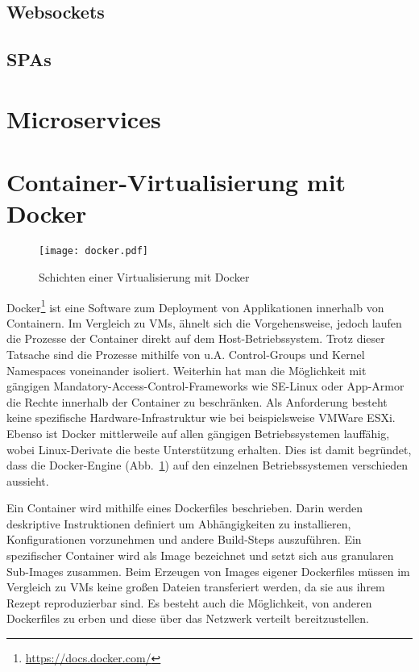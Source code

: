 \subsection{Websockets}
\blindtext
\subsection{\aclp{SPA}}
\blindtext
\section{Microservices}
\blindtext
\section{Container-Virtualisierung mit Docker}
\begin{figure}
  \centering
  \texttt{[image: docker.pdf]}
  \par
  \caption{Schichten einer Virtualisierung mit Docker}
  \label{fig:layers-docker}
\end{figure}
Docker\footnote{\url{https://docs.docker.com/}} ist eine Software zum Deployment von Applikationen innerhalb von Containern.
Im Vergleich zu \acp{VM}, ähnelt sich die Vorgehensweise, jedoch laufen die Prozesse der Container direkt auf dem Host-Betriebssystem.
Trotz dieser Tatsache sind die Prozesse mithilfe von \ac{u.A.} Control-Groups und Kernel Namespaces voneinander isoliert.
Weiterhin hat man die Möglichkeit mit gängigen Mandatory-Access-Control-Frameworks wie SE-Linux oder App-Armor die Rechte innerhalb der Container zu beschränken.
Als Anforderung besteht keine spezifische Hardware-Infrastruktur wie bei beispielsweise VMWare ESXi.
Ebenso ist Docker mittlerweile auf allen gängigen Betriebssystemen lauffähig, wobei Linux-Derivate die beste Unterstützung erhalten.
Dies ist damit begründet, dass die Docker-Engine (\acs{Abb.}~\ref{fig:layers-docker}) auf den einzelnen Betriebssystemen verschieden aussieht.
\par
Ein Container wird mithilfe eines Dockerfiles beschrieben.
Darin werden deskriptive Instruktionen definiert um Abhängigkeiten zu installieren, Konfigurationen vorzunehmen und andere Build-Steps auszuführen.
Ein spezifischer Container wird als Image bezeichnet und setzt sich aus granularen Sub-Images zusammen.
Beim Erzeugen von Images eigener Dockerfiles müssen im Vergleich zu \acp{VM} keine großen Dateien transferiert werden, da sie aus ihrem Rezept reproduzierbar sind. 
Es besteht auch die Möglichkeit, von anderen Dockerfiles zu erben und diese über das Netzwerk verteilt bereitzustellen.
